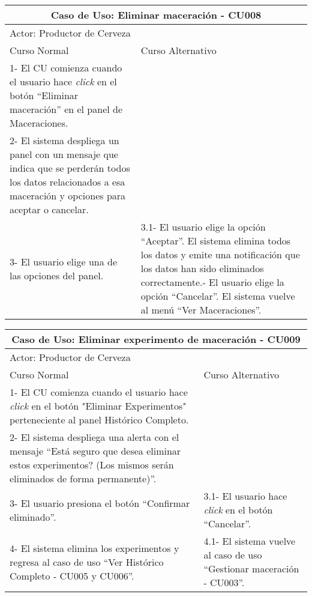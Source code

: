     
    \begin{minipage}{0.95\textwidth}
    \begin{center}
    \begin{tabularx}{\textwidth}{ | X | X |}
        \hline
        \multicolumn{2}{|c|}{\textbf{Caso de Uso: Eliminar maceración - CU008}} \\
        \hline
        \multicolumn{2}{|l|}{Actor: Productor de Cerveza} \\
        \hline
        Curso Normal & Curso Alternativo \\
        \hline
        1- El CU comienza cuando el usuario hace \textit{click} en el botón “Eliminar maceración” en el panel de Maceraciones. & \\
        \hline
        2- El sistema despliega un panel con un mensaje que indica que se perderán todos los datos relacionados a esa maceración y opciones para aceptar o cancelar. &
        \\
        \hline
        3- El usuario elige una de las opciones del panel. & 3.1- El usuario elige la opción “Aceptar”. El sistema elimina todos los datos y emite una notificación que los datos han sido eliminados correctamente.\newline
        3.2- El usuario elige la opción “Cancelar”. El sistema vuelve al menú “Ver Maceraciones”.
        \\
        \hline
    \end{tabularx}
    \label{CU008}
    \end{center}
    \end{minipage}
    
    
    \begin{minipage}{0.95\textwidth}
    \begin{center}
    \begin{tabularx}{\textwidth}{ | X | X |}
        \hline
        \multicolumn{2}{|c|}{\textbf{Caso de Uso: Eliminar experimento de maceración - CU009}} \\
        \hline
        \multicolumn{2}{|l|}{Actor: Productor de Cerveza} \\
        \hline
        Curso Normal & Curso Alternativo \\
        \hline
        1- El CU comienza cuando el usuario hace \textit{click} en el botón "Eliminar Experimentos" perteneciente al panel Histórico Completo. & \\
        \hline
        2- El sistema despliega una alerta con el mensaje “Está seguro que desea eliminar estos experimentos? (Los mismos serán eliminados de forma permanente)”. &
        \\
        \hline
        3- El usuario presiona el botón “Confirmar eliminado”. & 3.1- El usuario hace \textit{click} en el botón “Cancelar”.
        \\
        \hline
        4- El sistema elimina los experimentos y regresa al caso de uso “Ver Histórico Completo - CU005 y CU006”. & 4.1- El sistema vuelve al caso de uso “Gestionar maceración - CU003”.
        \\
        \hline
    \end{tabularx}
    \label{CU009}
    \end{center}
    \end{minipage}
    
